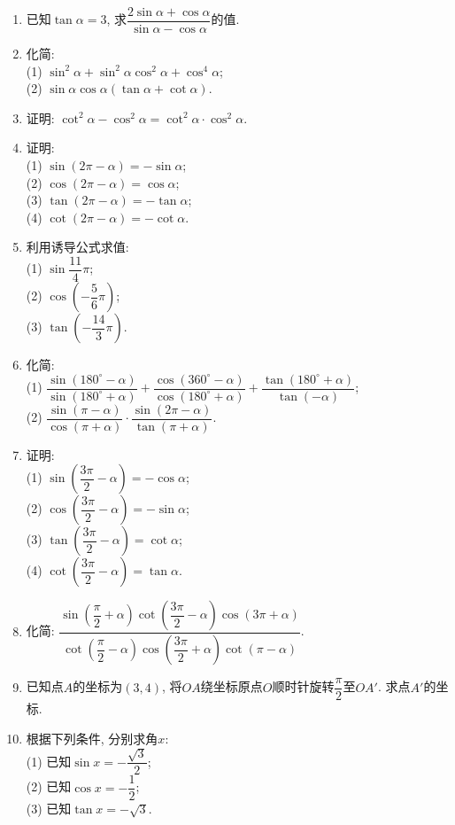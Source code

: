 \documentclass[10pt,a4paper]{article}
\begin{document}
\begin{enumerate}[1.]
\item 已知$\tan \alpha=3$, 求$\dfrac{2\sin \alpha+\cos \alpha}{\sin \alpha-\cos \alpha}$的值.
\item 化简:\\
(1) $\sin ^2\alpha+\sin ^2\alpha\cos ^2\alpha+\cos^4\alpha$;\\
(2) $\sin \alpha\cos \alpha(\tan \alpha+\cot \alpha)$.
\item 证明: $\cot ^2\alpha-\cos ^2\alpha=\cot ^2\alpha\cdot \cos ^2\alpha$.
\item 证明:\\
(1) $\sin (2\pi -\alpha)=-\sin \alpha$;\\
(2) $\cos (2\pi -\alpha)=\cos \alpha$;\\
(3) $\tan (2\pi -\alpha)=-\tan \alpha$;\\
(4) $\cot (2\pi -\alpha)=-\cot \alpha$.
\item 利用诱导公式求值:\\
(1) $\sin \dfrac{11}4\pi$;\\
(2) $\cos (-\dfrac 56\pi)$;\\
(3) $\tan (-\dfrac{14}3\pi)$.
\item 化简:\\
(1) $\dfrac{\sin (180^\circ -\alpha)}{\sin (180^\circ +\alpha)}+\dfrac{\cos (360^\circ -\alpha)}{\cos (180^\circ +\alpha)}+\dfrac{\tan (180^\circ +\alpha)}{\tan (-\alpha)}$;\\
(2) $\dfrac{\sin (\pi -\alpha)}{\cos (\pi +\alpha)}\cdot \dfrac{\sin (2\pi -\alpha)}{\tan (\pi +\alpha)}$.
\item 证明:\\
(1) $\sin (\dfrac{3\pi}2-\alpha)=-\cos \alpha$;\\
(2) $\cos (\dfrac{3\pi}2-\alpha)=-\sin \alpha$;\\
(3) $\tan (\dfrac{3\pi}2-\alpha)=\cot \alpha$;\\
(4) $\cot (\dfrac{3\pi}2-\alpha)=\tan \alpha$.
\item 化简: $\dfrac{\sin (\dfrac\pi 2+\alpha)\cot (\dfrac{3\pi}2-\alpha)\cos (3\pi +\alpha)}{\cot (\dfrac\pi 2-\alpha)\cos (\dfrac{3\pi} 2+\alpha)\cot (\pi -\alpha)}$.
\item 已知点$A$的坐标为$(3, 4)$, 将$OA$绕坐标原点$O$顺时针旋转$\dfrac\pi 2$至$OA'$. 求点$A'$的坐标.
\item 根据下列条件, 分别求角$x$:\\
(1) 已知$\sin x=-\dfrac{\sqrt 3}2$;\\
(2) 已知$\cos x=-\dfrac 12$;\\
(3) 已知$\tan x=-\sqrt 3$.

\end{enumerate}
\end{document}
